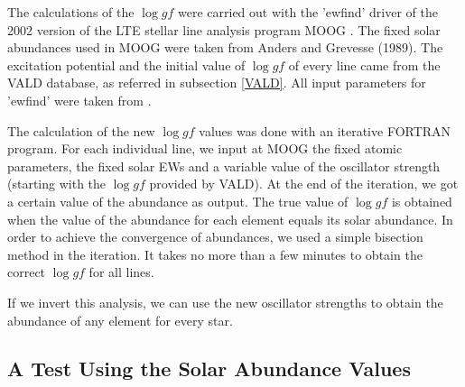 \documentclass[dvips,12pt,a4paper]{report}
\begin{document}
{The calculations of the $\log gf$ were carried out with the 'ewfind' driver of the 2002 version of the LTE stellar line analysis program MOOG \citep{Sneden-1973}. The fixed solar abundances used in MOOG were taken from Anders and Grevesse (1989). The excitation potential and the initial value of $\log gf$ of every line came from the VALD database, as referred in subsection \ref{VALD}. All input parameters for 'ewfind' were taken from \citet{Santos-2004b}. 



The calculation of the new $\log gf$ values was done with an iterative FORTRAN program. For each individual line, we input at MOOG the fixed atomic parameters, the fixed solar EWs and a variable value of the oscillator strength (starting with the $\log gf$ provided by VALD). At the end of the iteration, we got a certain value of the abundance as output. The true value of $\log gf$ is obtained when the value of the abundance for each element equals its solar abundance. %
In order to achieve the convergence of abundances, we used a simple bisection method in the iteration. It takes no more than a few minutes to obtain the correct $\log gf$ for all lines. 

If we invert this analysis, we can use the new oscillator strengths to obtain the abundance of any element for every star. %

\subsection {A Test Using the Solar Abundance Values}

}
\end{document}
